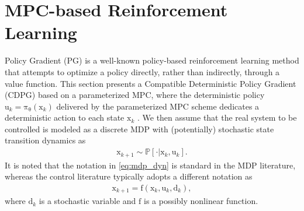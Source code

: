 \documentclass[10pt,twocolumn,twoside]{IEEEtran}
\newcommand{\vect}[1]{\ensuremath{\boldsymbol{\mathrm{#1}}}}
\begin{document}
\section{MPC-based Reinforcement Learning}\label{sec:2}
Policy Gradient (PG) is a well-known policy-based reinforcement learning method that attempts to optimize a policy directly, rather than indirectly, through a value function. This section presents a Compatible Deterministic Policy Gradient (CDPG) based on a parameterized MPC, where the deterministic policy $\vect u_k=\vect\pi_{\vect\theta}\left(\vect x_k\right)$ delivered by the parameterized MPC scheme dedicates a deterministic action to each state $\vect x_k$ \cite{silver2014deterministic}. We then assume that the real system to be controlled is modeled as a discrete MDP with (potentially) stochastic state transition dynamics as
\begin{align}\label{eq:mdp_dyn}
    \vect x_{k+1}\sim\mathbb{P}[\cdot|\vect x_k,\vect u_k].
\end{align}
It is noted that the notation in \eqref{eq:mdp_dyn} is standard in the MDP literature, whereas the control literature typically adopts a different notation as
\begin{align}\label{eq:real_dyn}
    \vect x_{k+1}=\vect f(\vect x_k,\vect u_k,\vect d_k),
\end{align}
where $\vect{d}_k$ is a stochastic variable and $\vect{f}$ is a possibly nonlinear function. 
\end{document}
